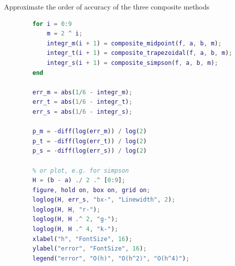         Approximate the order of accuracy of the three composite methods
        \begin{lstlisting}[language=Matlab, escapeinside=`', gobble=8]
        % approximate order of accuracy, either use diff or plot
        for i = 0:9
            m = 2 ^ i;
            integr_m(i + 1) = composite_midpoint(f, a, b, m);
            integr_t(i + 1) = composite_trapezoidal(f, a, b, m);
            integr_s(i + 1) = composite_simpson(f, a, b, m);
        end
        
        err_m = abs(1/6 - integr_m);
        err_t = abs(1/6 - integr_t);
        err_s = abs(1/6 - integr_s);
        
        p_m = -diff(log(err_m)) / log(2)
        p_t = -diff(log(err_t)) / log(2)
        p_s = -diff(log(err_s)) / log(2)
        
        % or plot, e.g. for simpson
        H = (b - a) ./ 2 .^ [0:9];
        figure, hold on, box on, grid on;
        loglog(H, err_s, "bx-", "Linewidth", 2);
        loglog(H, H, "r-");
        loglog(H, H .^ 2, "g-");
        loglog(H, H .^ 4, "k-");
        xlabel("h", "FontSize", 16);
        ylabel("error", "FontSize", 16);
        legend("error", "O(h)", "O(h^2)", "O(h^4)");
        \end{lstlisting}
            
